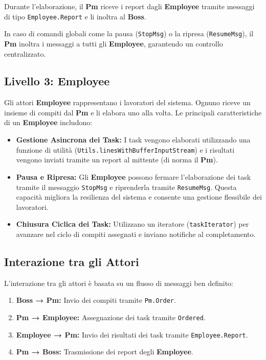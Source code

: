 Durante l'elaborazione, il \textbf{Pm} riceve i report dagli \textbf{Employee} tramite messaggi di tipo \texttt{Employee.Report} e li inoltra al \textbf{Boss}.  

In caso di comandi globali come la pausa (\texttt{StopMsg}) o la ripresa (\texttt{ResumeMsg}), il \textbf{Pm} inoltra i messaggi a tutti gli \textbf{Employee}, garantendo un controllo centralizzato.

\subsection*{Livello 3: Employee}
Gli attori \textbf{Employee} rappresentano i lavoratori del sistema. Ognuno riceve un insieme di compiti dal \textbf{Pm} e li elabora uno alla volta. Le principali caratteristiche di un \textbf{Employee} includono:
\begin{itemize}
    \item \textbf{Gestione Asincrona dei Task:} I task vengono elaborati utilizzando una funzione di utilità (\texttt{Utils.linesWithBufferInputStream}) e i risultati vengono inviati tramite un report al mittente (di norma il \textbf{Pm}).
    \item \textbf{Pausa e Ripresa:} Gli \textbf{Employee} possono fermare l'elaborazione dei task tramite il messaggio \texttt{StopMsg} e riprenderla tramite \texttt{ResumeMsg}. Questa capacità migliora la resilienza del sistema e consente una gestione flessibile dei lavoratori.
    \item \textbf{Chiusura Ciclica dei Task:} Utilizzano un iteratore (\texttt{taskIterator}) per avanzare nel ciclo di compiti assegnati e inviano notifiche al completamento.
\end{itemize}

\subsection*{Interazione tra gli Attori}
L'interazione tra gli attori è basata su un flusso di messaggi ben definito:
\begin{enumerate}
    \item \textbf{Boss → Pm:} Invio dei compiti tramite \texttt{Pm.Order}.
    \item \textbf{Pm → Employee:} Assegnazione dei task tramite \texttt{Ordered}.
    \item \textbf{Employee → Pm:} Invio dei risultati dei task tramite \texttt{Employee.Report}.
    \item \textbf{Pm → Boss:} Trasmissione dei report degli \textbf{Employee}.
\end{enumerate}

